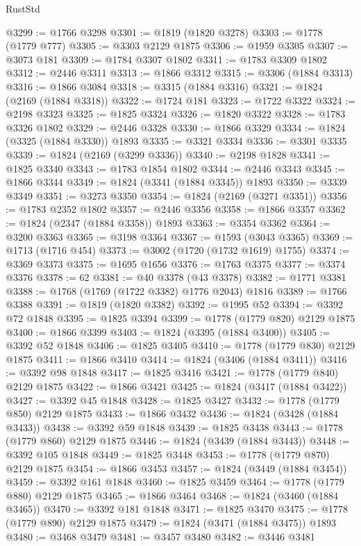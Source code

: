 \begin{lexlean}{RustStd}
\begin{coremodule}
{\begin{coremodule}
{{{{{{{{{{{{{{{{{{{{{{{{{{{{{{{{{{{{{{{{{{{{{{{@3299 := @1766 @3298
@3301 := @1819 (@1820 @3278)
@3303 := @1778 (@1779 @777)
@3305 := @3303 @2129 @1875
@3306 := @1959 @3305
@3307 := @3073 @181
@3309 := @1784 @3307 @1802
@3311 := @1783 @3309 @1802
@3312 := @2446 @3311
@3313 := @1866 @3312
@3315 := @3306 (@1884 @3313)
@3316 := @1866 @3084
@3318 := @3315 (@1884 @3316)
@3321 := @1824 (@2169 (@1884 @3318))
@3322 := @1724 @181
@3323 := @1722 @3322
@3324 := @2198 @3323
@3325 := @1825 @3324
@3326 := @1820 @3322
@3328 := @1783 @3326 @1802
@3329 := @2446 @3328
@3330 := @1866 @3329
@3334 := @1824 (@3325 (@1884 @3330)) @1893
@3335 := @3321 @3334
@3336 := @3301 @3335
@3339 := @1824 (@2169 (@3299 @3336))
@3340 := @2198 @1828
@3341 := @1825 @3340
@3343 := @1783 @1854 @1802
@3344 := @2446 @3343
@3345 := @1866 @3344
@3349 := @1824 (@3341 (@1884 @3345)) @1893
@3350 := @3339 @3349
@3351 := @3273 @3350
@3354 := @1824 (@2169 (@3271 @3351))
@3356 := @1783 @2352 @1802
@3357 := @2446 @3356
@3358 := @1866 @3357
@3362 := @1824 (@2347 (@1884 @3358)) @1893
@3363 := @3354 @3362
@3364 := @3200 @3363
@3365 := @3198 @3364
@3367 := @1593 (@3043 @3365)
@3369 := @1713 (@1716 @454)
@3373 := @3002 (@1720 (@1732 @1619) @1755)
@3374 := @3369 @3373
@3375 := @1695 @1656
@3376 := @1763 @3375
@3377 := @3374 @3376
@3378 := 62
@3381 := @40 @3378 (@43 @3378)
@3382 := @1771 @3381
@3388 := @1768 (@1769 (@1722 @3382) @1776 @2043) @1816
@3389 := @1766 @3388
@3391 := @1819 (@1820 @3382)
@3392 := @1995 @52
@3394 := @3392 @72 @1848
@3395 := @1825 @3394
@3399 := @1778 (@1779 @820) @2129 @1875
@3400 := @1866 @3399
@3403 := @1824 (@3395 (@1884 @3400))
@3405 := @3392 @52 @1848
@3406 := @1825 @3405
@3410 := @1778 (@1779 @830) @2129 @1875
@3411 := @1866 @3410
@3414 := @1824 (@3406 (@1884 @3411))
@3416 := @3392 @98 @1848
@3417 := @1825 @3416
@3421 := @1778 (@1779 @840) @2129 @1875
@3422 := @1866 @3421
@3425 := @1824 (@3417 (@1884 @3422))
@3427 := @3392 @45 @1848
@3428 := @1825 @3427
@3432 := @1778 (@1779 @850) @2129 @1875
@3433 := @1866 @3432
@3436 := @1824 (@3428 (@1884 @3433))
@3438 := @3392 @59 @1848
@3439 := @1825 @3438
@3443 := @1778 (@1779 @860) @2129 @1875
@3446 := @1824 (@3439 (@1884 @3443))
@3448 := @3392 @105 @1848
@3449 := @1825 @3448
@3453 := @1778 (@1779 @870) @2129 @1875
@3454 := @1866 @3453
@3457 := @1824 (@3449 (@1884 @3454))
@3459 := @3392 @161 @1848
@3460 := @1825 @3459
@3464 := @1778 (@1779 @880) @2129 @1875
@3465 := @1866 @3464
@3468 := @1824 (@3460 (@1884 @3465))
@3470 := @3392 @181 @1848
@3471 := @1825 @3470
@3475 := @1778 (@1779 @890) @2129 @1875
@3479 := @1824 (@3471 (@1884 @3475)) @1893
@3480 := @3468 @3479
@3481 := @3457 @3480
@3482 := @3446 @3481
}}}}}}}}}}}}}}}}}}}}}}}}}}}}}}}}}}}}}}}}}}}}}}}
\end{coremodule}}
\end{coremodule}
\end{lexlean}
